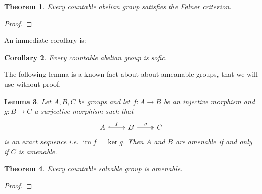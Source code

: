 \documentclass[titlepage, a4paper]{article}
\newcommand{\card}[1]{\left| #1 \right|}
\DeclareMathOperator{\im}{im}
\newtheorem{theorem}{Theorem}[section]
\newtheorem{lemma}[theorem]{Lemma}
\newtheorem{corollary}[theorem]{Corollary}
\theoremstyle{remark}
\begin{document}
    \begin{theorem}\label{thm:countable_abelian_folner}
        Every countable abelian group satisfies the Følner criterion. 
    \end{theorem}
    \begin{proof}
        
    \end{proof}
    An immediate corollary is:
    \begin{corollary}
    	Every countable abelian group is sofic.	
    \end{corollary}
	The following lemma is a known fact about about ameanable groups, that we will use without proof.
    \begin{lemma}
        \label{lem:amenable_short_exact_sequence}
        Let $A, B, C$ be groups and let $f: A\to B$ be an injective morphism and $g:B\to C$ a surjective morphism such that 
        \[\begin{tikzcd}
            A \arrow[r, "f", hook] & B \arrow[r, "g", two heads] & C
        \end{tikzcd}\]
        is an exact sequence i.e. $\im f = \ker g$. Then $A$ and $B$ are amenable if and only if $C$ is amenable.
    \end{lemma}

    \begin{theorem}
        Every countable solvable group is amenable. 
    \end{theorem}
    \begin{proof}
        
    \end{proof}
\end{document}
